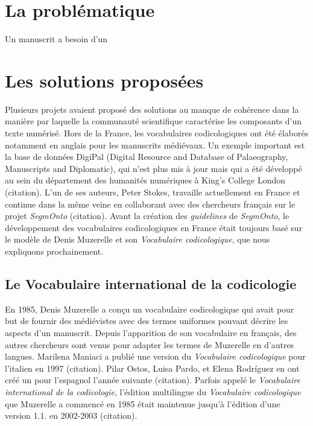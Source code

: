 \documentclass[class=article, crop=false]{standalone}
\begin{document}
	
\section{La problématique}

Un manuscrit a besoin d'un 

\section{Les solutions proposées}

Plusieurs projets avaient proposé des solutions au manque de cohérence dans la manière par laquelle la communauté scientifique caractérise les composants d'un texte numérisé. Hors de la France, les vocabulaires codicologiques ont été élaborés notamment en anglais pour les manuscrits médiévaux. Un exemple important est la base de données DigiPal (Digital Resource and Database of Palaeography, Manuscripts and Diplomatic), qui n'est plus mis à jour mais qui a été développé au sein du département des humanités numériques à King's College London (citation). L'un de ses auteurs, Peter Stokes, travaille actuellement en France et continue dans la même veine en collaborant avec des chercheurs français sur le projet \textit{SegmOnto} (citation). Avant la création des \textit{guidelines} de \textit{SegmOnto}, le développement des vocabulaires codicologiques en France était toujours basé sur le modèle de Denis Muzerelle et son \textit{Vocabulaire codicologique}, que nous expliquons prochainement.

\subsection{Le Vocabulaire international de la codicologie}

En 1985, Denis Muzerelle a conçu un vocabulaire codicologique qui avait pour but de fournir des médiévistes avec des termes uniformes pouvant décrire les aspects d'un manuscrit. Depuis l'apparition de son vocabulaire en français, des autres chercheurs sont venus pour adapter les termes de Muzerelle en d'autres langues. Marilena Maniaci a publié une version du \textit{Vocabulaire codicologique} pour l'italien en 1997 (citation). Pilar Ostos, Luisa Pardo, et Elena Rodríguez en ont créé un pour l'espagnol l'année suivante (citation). Parfois appelé le \textit{Vocabulaire international de la codicologie}, l'édition multilingue du \textit{Vocabulaire codicologique} que Muzerelle a commencé en 1985 était maintenue jusqu'à l'édition d'une version 1.1. en 2002-2003 (citation).
\end{document}
